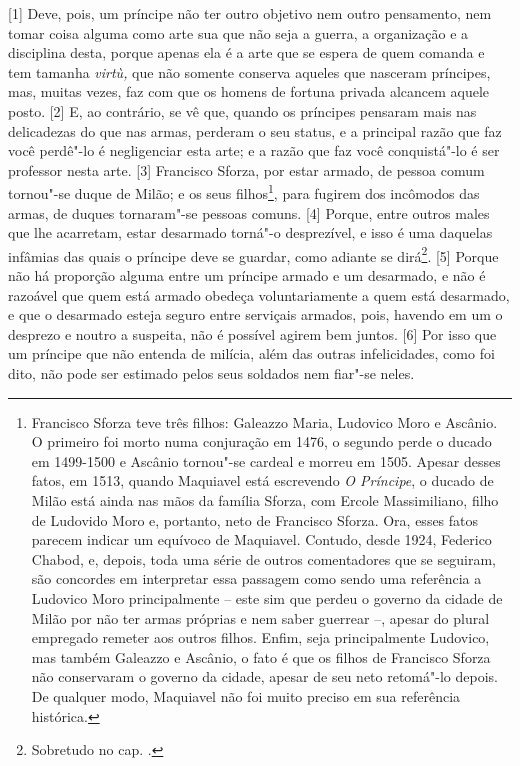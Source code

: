 {[}1{]} Deve, pois, um príncipe não ter outro objetivo nem outro
pensamento, nem tomar coisa alguma como arte sua que não seja a guerra,
a organização e a disciplina desta, porque apenas ela é a arte que se
espera de quem comanda e tem tamanha \emph{virtù,} que não somente
conserva aqueles que nasceram príncipes, mas, muitas vezes, faz com que
os homens de fortuna privada alcancem aquele posto. {[}2{]} E, ao
contrário, se vê que, quando os príncipes pensaram mais nas delicadezas
do que nas armas, perderam o seu status, e a principal razão que faz
você perdê"-lo é negligenciar esta arte; e a razão que faz você
conquistá"-lo é ser professor nesta arte. {[}3{]} Francisco Sforza, por
estar armado, de pessoa comum tornou"-se duque de Milão; e os seus
filhos\footnote{Francisco Sforza teve três filhos: Galeazzo Maria,
  Ludovico Moro e Ascânio. O primeiro foi morto numa conjuração em 1476,
  o segundo perde o ducado em 1499-1500 e Ascânio tornou"-se cardeal e
  morreu em 1505. Apesar desses fatos, em 1513, quando Maquiavel está
  escrevendo \emph{O Príncipe}, o ducado de Milão está ainda nas mãos da
  família Sforza, com Ercole Massimiliano, filho de Ludovido Moro e,
  portanto, neto de Francisco Sforza. Ora, esses fatos parecem indicar
  um equívoco de Maquiavel. Contudo, desde 1924, Federico Chabod, e,
  depois, toda uma série de outros comentadores que se seguiram, são
  concordes em interpretar essa passagem como sendo uma referência a
  Ludovico Moro principalmente -- este sim que perdeu o governo da cidade
  de Milão por não ter armas próprias e nem saber guerrear --, apesar do
  plural empregado remeter aos outros filhos. Enfim, seja principalmente
  Ludovico, mas também Galeazzo e Ascânio, o fato é que os filhos de
  Francisco Sforza não conservaram o governo da cidade, apesar de seu
  neto retomá"-lo depois. De qualquer modo, Maquiavel não foi muito
  preciso em sua referência histórica.}, para fugirem dos incômodos das
armas, de duques tornaram"-se pessoas comuns. {[}4{]} Porque, entre
outros males que lhe acarretam, estar desarmado torná"-o desprezível, e
isso é uma daquelas infâmias das quais o príncipe deve se guardar, como
adiante se dirá\footnote{Sobretudo no cap. .}. {[}5{]} Porque não há
proporção alguma entre um príncipe armado e um desarmado, e não é
razoável que quem está armado obedeça voluntariamente a quem está
desarmado, e que o desarmado esteja seguro entre serviçais armados,
pois, havendo em um o desprezo e noutro a suspeita, não é possível
agirem bem juntos. {[}6{]} Por isso que um príncipe que não entenda de
milícia, além das outras infelicidades, como foi dito, não pode ser
estimado pelos seus soldados nem fiar"-se neles.

